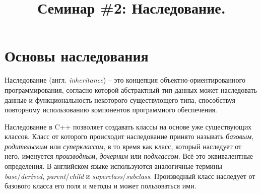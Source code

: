 \documentclass{article}
\begin{document}
\title{Семинар \#2: Наследование. \vspace{-5ex}}\date{}\maketitle
\section{Основы наследования}
Наследование (англ. \textit{inheritance}) -- это концепция объектно-ориентированного программирования, согласно которой абстрактный тип данных может наследовать данные и функциональность некоторого существующего типа, способствуя повторному использованию компонентов программного обеспечения.

Наследование в C++ позволяет создавать классы на основе уже существующих классов. Класс от которого происходит наследование принято называть \textit{базовым}, \textit{родительским} или \textit{суперклассом}, в то время как класс, который наследует от него, именуется \textit{производным}, \textit{дочерним} или \textit{подклассом}. Всё это эквивалентные определения. В английском языке используются аналогичные термины \textit{base}/\textit{derived}, \textit{parent}/\textit{child} и \textit{superclass}/\textit{subclass}. Производный класс наследует от базового класса его поля и методы и может пользоваться ими.
\end{document}
